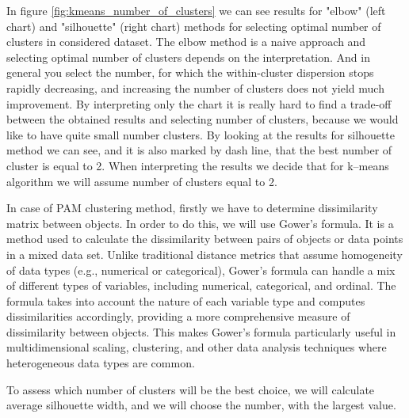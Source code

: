 \documentclass[11pt,a4paper]{article}\usepackage[]{graphicx}\usepackage[]{xcolor}
\begin{document}
	In figure \ref{fig:kmeans_number_of_clusters} we can see results for "elbow" (left chart) and "silhouette" (right chart) methods for selecting optimal number of clusters in considered dataset. The elbow method is a naive approach and selecting optimal number of clusters depends on the interpretation. And in general you select the number, for which the within-cluster dispersion stops rapidly decreasing, and increasing the number of clusters does not yield much improvement. By interpreting only the chart it is really hard to find a trade-off between the obtained results and selecting number of clusters, because we would like to have quite small number clusters. By looking at the results for silhouette method we can see, and it is also marked by dash line, that the best number of cluster is equal to 2. When interpreting the results we decide that for k--means algorithm we will assume number of clusters equal to 2.
	
	In case of PAM clustering method, firstly we have to determine dissimilarity matrix between objects. In order to do this, we will use Gower's formula. It is a method used to calculate the dissimilarity between pairs of objects or data points in a mixed data set. Unlike traditional distance metrics that assume homogeneity of data types (e.g., numerical or categorical), Gower's formula can handle a mix of different types of variables, including numerical, categorical, and ordinal. The formula takes into account the nature of each variable type and computes dissimilarities accordingly, providing a more comprehensive measure of dissimilarity between objects. This makes Gower's formula particularly useful in multidimensional scaling, clustering, and other data analysis techniques where heterogeneous data types are common.

	
	To assess which number of clusters will be the best choice, we will calculate average silhouette width, and we will choose the number, with the largest value.
	
\end{document}
